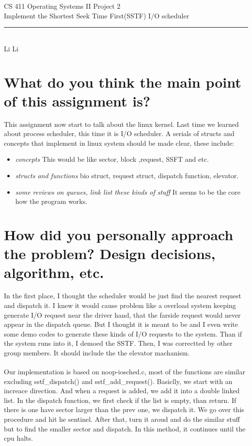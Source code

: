\documentclass[12pt,letterpaper]{article}
\begin{document}
\begin{titlepage}
    \vspace*{4cm}
    \begin{flushleft}
    {\huge
        CS 411 Operating Systems II Project 2\\[.5cm]
    }
    {\large
        Implement the Shortest Seek Time First(SSTF) I/O scheduler
    }
    \end{flushleft}
    \vfill
    \rule{5in}{.5mm}\\
    Li Li

\end{titlepage}
\section{What do you think the main point of this assignment is?}
\indent This assignment now start to talk about the linux kernel. Last time we learned about process scheduler, this time it is I/O scheduler. A serials of structs and concepts that implement in linux system should be made clear, these include:
\begin{itemize}
\item \emph{concepts}  This would be like sector, block ,request, SSFT and etc.
\item \emph{structs and functions} bio struct, request struct, dispatch function, elevator.
\item \emph{some reviews on queues, link list these kinds of stuff} It seems to be the core how the program works.
\end{itemize}


\section{How did you personally approach the problem? Design decisions, algorithm, etc.}
\indent In the first place, I thought the scheduler would be just find the nearest request and dispatch it. I knew it would cause problem like a overload system keeping generate I/O request near the driver hand, that the farside request would never appear in the dispatch queue. But I thought it is meant to be and  I even write some demo codes to generate these kinds of I/O requests to the system. Than if the system runs into it, I demoed the SSTF. Then, I was correctted by other group members. It should include the the elevator machanism.\\\\
\indent Our implementation is based on noop-iosched.c, most of the functions are similar excluding sstf\_dispatch() and sstf\_add\_request().  Basiclly, we start with an increace direction. And when a request is added, we add it into a double linked list. In the dispatch function, we first check if the list is empty, than return. If there is one have sector larger than the prev one, we dispatch it. We go over this procedure and hit he sentinel. After that, turn it aroud and do the similar stuff but to find the smaller sector and dispatch. In this method, it continues until the cpu halts.
\end{document}
